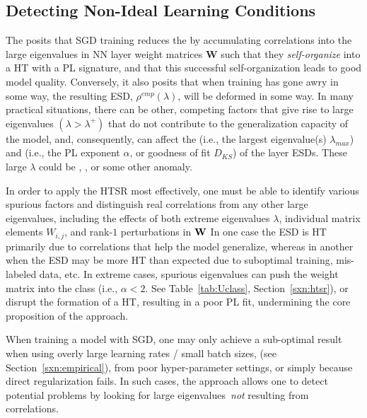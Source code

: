 \subsection{Detecting Non-Ideal Learning Conditions}
\label{sxn:HT_ESDs}


The \HTSR \Phenomenology posits that SGD training reduces the \emph{\TrainingError} by accumulating correlations into the large eigenvalues
in NN layer weight matrices  $\mathbf{W}$ such that they \emph{self-organize} into a HT with a PL signature,
and that this successful self-organization leads to good model quality.
Conversely, it also posits that when training has gone awry in some way, the resulting ESD, $\rho^{emp}(\lambda)$, will
be deformed in some way.   
In many practical situations, there can be other, 
competing factors that give rise to large eigenvalues $(\lambda>\lambda^{+})$
that do not contribute to the generalization capacity of the model, and, consequently, 
can affect the \Scale (i.e., the largest eigenvalue(s) $\lambda_{max}$) 
and \Shape (i.e., the PL exponent $\alpha$, or goodness of fit $D_{KS}$) of the layer ESDs.
These large $\lambda$ could be \DragonKings, \emph{\CorrelationTraps}, or some other anomaly.

In order to apply the HTSR \Phenomenology most effectively, one must be able to identify various spurious factors and
distinguish real correlations from any other large eigenvalues, including the effects of both
extreme eigenvalues $\lambda$, individual matrix elements $W_{i,j}$, and rank-$1$ perturbations in ${\mathbf{W}}$
In one case the ESD is HT primarily due to correlations that help the model generalize, whereas
in another when the ESD may be more HT than expected due to suboptimal training, mis-labeled data, etc.
In extreme cases, spurious eigenvalues can push the weight matrix
into the \VeryHeavyTailed \Universality class (i.e., $\alpha<2$. See Table~\ref{tab:Uclass}, Section~\ref{sxn:htsr}), or
disrupt the formation of a HT, resulting in a poor PL fit, undermining the core proposition of the  \HTSR approach.

When training a model with SGD, one may only achieve  a sub-optimal result
when using overly large learning rates / small batch sizes, (see Section~\ref{sxn:empirical}),
from poor hyper-parameter settings,
or simply because direct regularization fails. In such cases, the \HTSR approach allows one to detect
potential problems by looking for large eigenvalues~\emph{not} resulting from correlations.\cite{GSZ20_TR}

